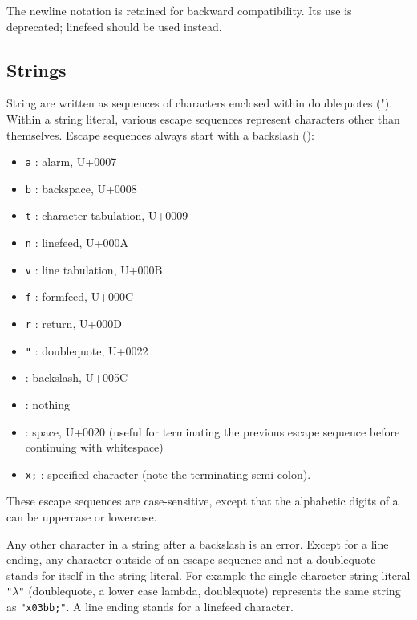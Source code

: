 \begin{note}
  The {\cf\sharpsign\backwhack{}newline} notation is retained for
  backward compatibility.  Its use is deprecated;
  {\cf\sharpsign\backwhack{}linefeed} should be used instead.
\end{note}

\subsection{Strings}

\vest String are written as sequences of characters enclosed within doublequotes
({\cf "}).  Within a string literal, various escape
sequences represent characters other than
themselves.  Escape sequences always start with a backslash (\backwhack{}):

\begin{itemize}
\item{\tt \backwhack{}a} : alarm, U+0007
\item{\tt \backwhack{}b} : backspace, U+0008 
\item{\tt \backwhack{}t} : character tabulation, U+0009 
\item{\tt \backwhack{}n} : linefeed, U+000A 
\item{\tt \backwhack{}v} : line tabulation, U+000B 
\item{\tt \backwhack{}f} : formfeed, U+000C 
\item{\tt \backwhack{}r} : return, U+000D 
\item{\tt \backwhack{}}\verb|"| : doublequote, U+0022 
\item{\tt \backwhack{}\backwhack{}} : backslash, U+005C 
\item{\tt \backwhack{}} : nothing
\item{\tt \backwhack{}} : space, U+0020 (useful for terminating the
  previous escape sequence before continuing with whitespace)
\item{\tt \backwhack{}x;} : specified character (note the
  terminating semi-colon).
\end{itemize}

These escape sequences are case-sensitive, except that the alphabetic
digits of a  can be uppercase or lowercase.

Any other character in a string after a backslash is an error. Except
for a line ending, any
character outside of an escape sequence and not a doublequote stands
for itself in the string literal. For example the single-character
string literal {\tt "$\lambda$"} (doublequote, a lower case lambda, doublequote)
represents the same string as {\tt "\backwhack{}x03bb;"}.
A line ending stands for a linefeed character.

